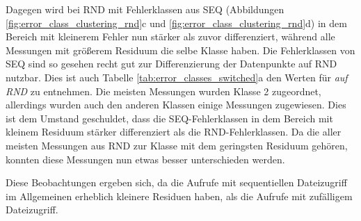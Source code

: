 \documentclass[
	12pt,
	a4paper,
	BCOR10mm,
	DIV14,
	listof=totoc,
	bibliography=totoc,
	headsepline
]{scrreprt}
\begin{document}
Dagegen wird bei RND mit Fehlerklassen aus SEQ (Abbildungen \ref{fig:error_class_clustering_rnd}c und \ref{fig:error_class_clustering_rnd}d) in dem Bereich mit kleinerem Fehler nun stärker als zuvor differenziert, während alle Messungen mit größerem Residuum die selbe Klasse haben.
Die Fehlerklassen von SEQ sind so gesehen recht gut zur Differenzierung der Datenpunkte auf RND nutzbar.
Dies ist auch Tabelle \ref{tab:error_classes_switched}a den Werten für \textit{auf RND} zu entnehmen. Die meisten Messungen wurden Klasse 2 zugeordnet, allerdings wurden auch den anderen Klassen einige Messungen zugewiesen.
Dies ist dem Umstand geschuldet, dass die SEQ-Fehlerklassen in dem Bereich mit kleinem Residuum stärker differenziert als die RND-Fehlerklassen.
Da die aller meisten Messungen aus RND zur Klasse mit dem geringsten Residuum gehören, konnten diese Messungen nun etwas besser unterschieden werden.\medskip

Diese Beobachtungen ergeben sich, da die Aufrufe mit sequentiellen Dateizugriff im Allgemeinen erheblich kleinere Residuen haben, als die Aufrufe mit zufälligem Dateizugriff.
\end{document}
